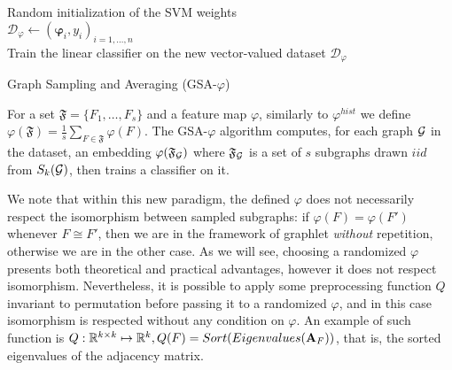 \begin{algorithm}[t]
	\label{alg:GSA}
\DontPrintSemicolon
  \\
  \\
  \Algo{\\}
  Random initialization of the SVM weights\\
  $\mathcal{D}_{\varphi}\gets (\bm{\varphi}_i,y_i)_{i=1,\ldots, n}$\\
  Train the linear classifier on the new vector-valued dataset $\mathcal{D}_{\varphi}$
\caption{Graph Sampling and Averaging (GSA-$\varphi$)}
\end{algorithm}

For a set $\mathfrak{F} = \{F_1,\ldots, F_s\}$ and a feature map $\varphi$, similarly to ${\varphi}^{hist}$ we define ${\varphi}(\mathfrak{F}) = \frac{1}{s} \sum_{F\in\mathfrak{F}} \varphi(F)$. The GSA-$\varphi$ algorithm computes, for each graph $\mathcal{G}$ in the dataset, an embedding ${\varphi}(\mathfrak{F}_{\mathcal{G}})$ where $\mathfrak{F}_{\mathcal{G}}$ is a set of $s$ subgraphs drawn $iid$ from $S_k(\mathcal{G})$, then trains a classifier on it.

We note that within this new paradigm, the defined $\varphi$ does not necessarily respect the isomorphism between sampled subgraphs: if $\varphi(F) = \varphi(F')$ whenever $F \cong F'$, then we are in the framework of graphlet \emph{without} repetition, otherwise we are in the other case. As we will see, choosing a randomized $\varphi$ presents both theoretical and practical advantages, however it does not respect isomorphism. Nevertheless, it is possible to apply some preprocessing function $Q$ invariant to permutation before passing it to a randomized $\varphi$, and in this case isomorphism is respected without any condition on $\varphi$. An example of such function is $Q:\mathbb{R}^{k\times k}\mapsto \mathbb{R}^k, Q(F)=Sort(Eigenvalues(\mathbf{A}_F))$, that is, the sorted eigenvalues of the adjacency matrix. 

